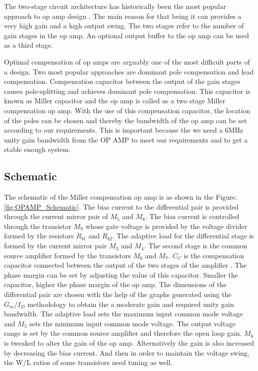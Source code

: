 The two-stage circuit architecture has historically been the most popular approach to op amp design \cite{opamp_basic}. The main reason for that being it can provides a very high gain and a high output swing. The two stages refer to the number of gain stages in the op amp. An optional output buffer to the op amp can be used as a third stage. 

Optimal compensation of op amps are arguably one of the most difficult parts of a design. Two most popular approaches are dominant pole compensation and lead compensation. Compensation capacitor between the output of the gain stages causes pole-splitting and achieves dominant pole compensation. This capacitor is known as Miller capacitor and the op amp is called as a two stage Miller compensation op amp. With the use of this compensation capacitor, the location of the poles can be chosen and thereby the bandwidth of the op amp can be set according to our requirements. This is important because the we need a 6MHz unity gain bandwidth from the OP AMP to meet our requirements and to get a stable enough system.

\subsection{Schematic}
The schematic of the Miller compensation op amp is as shown in the Figure.\ref{fig:OPAMP_Schematic}. The bias current to the differential pair is provided through the current mirror pair of $M_5$ and $M_8$. The bias current is controlled through the transistor $M_9$ whose gate voltage is provided by the voltage divider formed by the resistors $R_{b1}$ and $R_{b2}$. The adaptive load for the differential stage is formed by the current mirror pair $M_3$ and $M_4$. The second stage is the common source amplifier formed by the transistors $M_6$ and $M_7$. $C_C$ is the compensation capacitor connected between the output of the two stages of the amplifier \cite{aicd_opamp_design}. The phase margin can be set by adjusting the value of this capacitor.  Smaller the capacitor, higher the phase margin of the op amp. The dimensions of the differential pair are chosen with the help of the graphs generated using the $G_m/I_D$ methodology to obtain the a moderate gain and required unity gain bandwidth. The adaptive load sets the maximum input common mode voltage and $M_5$ sets the minimum input common mode voltage. The output voltage range is set by the common source amplifier and therefore the open loop gain. $M_6$ is tweaked to alter the gain of the op amp. Alternatively the gain is also increased by decreasing the bias current. And then in order to maintain the voltage swing, the W/L ratios of some transistors need tuning as well.


